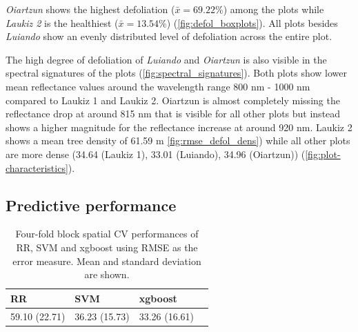 \documentclass[review]{elsarticle}
\begin{document}
\textit{Oiartzun} shows the highest defoliation ($\bar{x} = 69.22 \%$) among the plots while \textit{Laukiz 2} is the healthiest ($\bar{x} = 13.54 \%$) (\autoref{fig:defol_boxplots}).
All plots besides \textit{Luiando} show an evenly distributed level of defoliation across the entire plot.

The high degree of defoliation of \textit{Luiando} and \textit{Oiartzun} is also visible in the spectral signatures of the plots (\autoref{fig:spectral_signatures}).
Both plots show lower mean reflectance values around the wavelength range 800 nm - 1000 nm compared to Laukiz 1 and Laukiz 2.
Oiartzun is almost completely missing the reflectance drop at around 815 nm that is visible for all other plots but instead shows a higher magnitude for the reflectance increase at around 920 nm.
Laukiz 2 shows a mean tree density of 61.59 m \autoref{fig:rmse_defol_dens}) while all other plots are more dense (34.64 (Laukiz 1), 33.01 (Luiando), 34.96 (Oiartzun)) (\autoref{fig:plot-characteristics}).

\subsection{Predictive performance}

\begin{table}[t!]
\centering
\caption[t]{Four-fold block spatial \ac{CV} performances of RR, SVM and xgboost using \ac{RMSE} as the error measure.
	Mean and standard deviation are shown.}
\begingroup\footnotesize
\begin{tabular}{llll}
	RR            & SVM           & xgboost       \\
	\hline
	59.10 (22.71) & 36.23 (15.73) & 33.26 (16.61) \\
	\bottomrule
\end{tabular}
\endgroup
\label{tab:penalty_comparison}
\end{table}
\end{document}

